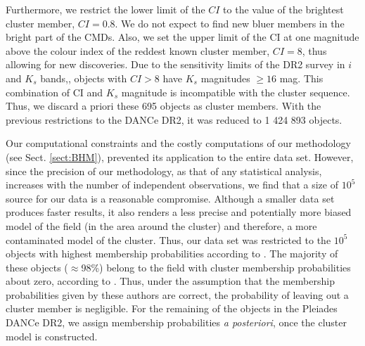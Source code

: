 Furthermore, we restrict the lower limit of the $CI$ to the value of the brightest cluster member, $CI =0.8$. We do not expect to find new bluer members in the bright part of the CMDs. Also, we set the upper limit of the CI at one magnitude above the colour index of the reddest known cluster member, $CI=8$, thus allowing for new discoveries. Due to the sensitivity limits of the DR2 survey in $i$ and $K_s$ bands,\cite[$i\approx23$ mag and $K_s\approx18$ mag, see Appendix A of][]{Bouy2015}, objects with $CI>8$ have $K_s$ magnitudes $\geq 16$ mag. This combination of CI and $K_s$ magnitude is incompatible with the cluster sequence. Thus, we discard a priori these 695 objects as cluster members. With the previous restrictions to the DANCe DR2, it was reduced to 1 424 893 objects.


Our computational constraints and the costly computations of our methodology (see Sect. \ref{sect:BHM}), prevented its application to the entire data set. However, since the precision of our methodology, as that of any statistical analysis, increases with the number of independent observations, we find that a size of $10^5$ source for our data is a reasonable compromise. Although a smaller data set produces faster results, it also renders a less precise and potentially more biased model of the field (in the area around the cluster) and therefore, a more contaminated model of the cluster. Thus, our data set was restricted to the $10^5$ objects with highest membership probabilities according to \citet{Bouy2015}. The majority of these objects ($\approx$98\%) belong to the field with cluster membership probabilities about zero, according to \citet{Sarro2014,Bouy2015}. Thus, under the assumption that the membership probabilities given by these authors are correct, the probability of leaving out a cluster member is negligible. For the remaining of the objects in the Pleiades DANCe DR2, we assign membership probabilities \emph{a posteriori}, once the cluster model is constructed. 



